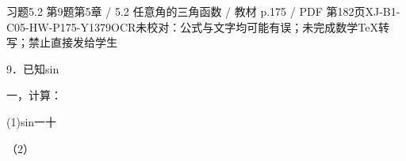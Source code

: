 \begin{bankitem}{习题5.2 第9题}{第5章 / 5.2 任意角的三角函数 / 教材 p.175 / PDF 第182页}{XJ-B1-C05-HW-P175-Y1379}{OCR未校对：公式与文字均可能有误；未完成数学TeX转写；禁止直接发给学生}
\begin{ocrdraft}
\par
9．已知sin
\par
一，计算：
\par
(1)sin一十
\par
（2）
\end{ocrdraft}
\end{bankitem}
